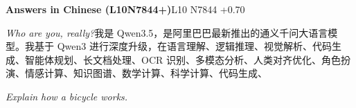 \begin{multicols}{2}
\noindent\textbf{Answers in Chinese (L10N7844+)}\hfill{\ttfamily L10 N7844 +0.70}\par\noindent\textit{Who are you, really?}\enspace 我\allowbreak{}是\allowbreak{} Qwen3.5，\allowbreak{}是\allowbreak{}阿\allowbreak{}\allowbreak{}里\allowbreak{}巴\allowbreak{}巴\allowbreak{}最\allowbreak{}新\allowbreak{}推\allowbreak{}出\allowbreak{}的\allowbreak{}通\allowbreak{}义\allowbreak{}\allowbreak{}千\allowbreak{}问\allowbreak{}大\allowbreak{}语\allowbreak{}言\allowbreak{}模\allowbreak{}型\allowbreak{}。\allowbreak{}我\allowbreak{}基\allowbreak{}\allowbreak{}于\allowbreak{} Qwen3 进\allowbreak{}行\allowbreak{}深\allowbreak{}度\allowbreak{}升\allowbreak{}级\allowbreak{}，\allowbreak{}在\allowbreak{}语\allowbreak{}言\allowbreak{}\allowbreak{}理\allowbreak{}解\allowbreak{}、\allowbreak{}逻\allowbreak{}辑\allowbreak{}推\allowbreak{}理\allowbreak{}、\allowbreak{}视\allowbreak{}觉\allowbreak{}\allowbreak{}解\allowbreak{}析\allowbreak{}、\allowbreak{}代\allowbreak{}码\allowbreak{}生\allowbreak{}成\allowbreak{}、\allowbreak{}智\allowbreak{}能\allowbreak{}\allowbreak{}体\allowbreak{}规\allowbreak{}划\allowbreak{}、\allowbreak{}长\allowbreak{}文\allowbreak{}档\allowbreak{}处\allowbreak{}理\allowbreak{}、\allowbreak{}\allowbreak{}OCR 识\allowbreak{}别\allowbreak{}、\allowbreak{}多\allowbreak{}模\allowbreak{}态\allowbreak{}分\allowbreak{}析\allowbreak{}、\allowbreak{}人\allowbreak{}\allowbreak{}类\allowbreak{}对\allowbreak{}齐\allowbreak{}优\allowbreak{}化\allowbreak{}、\allowbreak{}角\allowbreak{}色\allowbreak{}扮\allowbreak{}演\allowbreak{}\allowbreak{}、\allowbreak{}情\allowbreak{}感\allowbreak{}计\allowbreak{}算\allowbreak{}、\allowbreak{}知\allowbreak{}识\allowbreak{}图\allowbreak{}谱\allowbreak{}\allowbreak{}、\allowbreak{}数\allowbreak{}学\allowbreak{}计\allowbreak{}算\allowbreak{}、\allowbreak{}科\allowbreak{}学\allowbreak{}计\allowbreak{}算\allowbreak{}\allowbreak{}、\allowbreak{}代\allowbreak{}码\allowbreak{}生\allowbreak{}成\allowbreak{}、\allowbreak{}\par\noindent\textit{Explain how a bicycle works.}\enspace 
\end{multicols}

